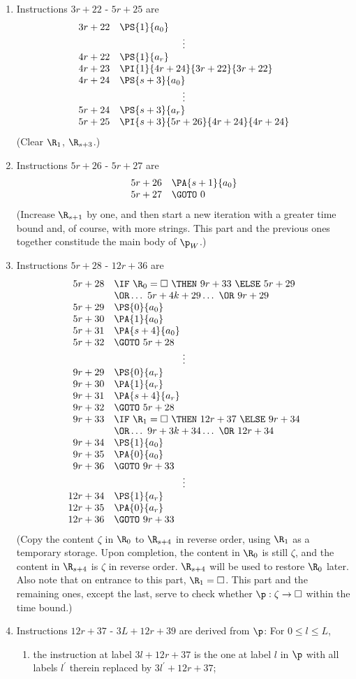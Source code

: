 \begin{enumerate}[1.]
\begin{enumerate}[(1)]
\item Instructions $3r + 22$ - $5r + 25$ are
\[
\begin{array}{rl}
3r + 22 & \PS{1}{a_0} \cr
\multicolumn{2}{c}{\vdots} \cr
4r + 22 & \PS{1}{a_r} \cr
4r + 23 & \PI{1}{4r + 24}{3r + 22}{3r + 22} \cr
4r + 24 & \PS{s + 3}{a_0} \cr
\multicolumn{2}{c}{\vdots} \cr
5r + 24 & \PS{s + 3}{a_r} \cr
5r + 25 & \PI{s + 3}{5r + 26}{4r + 24}{4r + 24}
\end{array}
\]
(Clear $\R_1$, $\R_{s + 3}$.)
\item Instructions $5r + 26$ - $5r + 27$ are
\[
\begin{array}{rl}
5r + 26 & \PA{s + 1}{a_0} \cr
5r + 27 & \GOTO \ 0
\end{array}
\]
(Increase $\R_{s + 1}$ by one, and then start a new iteration with a greater time bound and, of course, with more strings. This part and the previous ones together constitude the main body of $\p_W$.)
\item Instructions $5r + 28$ - $12r + 36$ are
\[
\begin{array}{rl}
5r + 28 & \IF \ \R_0 = \Box \ \THEN \ 9r + 33 \ \ELSE \ 5r + 29 \cr
\       & \OR \ldots \ 5r + 4k + 29 \ldots \ \OR \ 9r + 29 \cr
5r + 29 & \PS{0}{a_0} \cr
5r + 30 & \PA{1}{a_0} \cr
5r + 31 & \PA{s + 4}{a_0} \cr
5r + 32 & \GOTO \ 5r + 28 \cr
\multicolumn{2}{c}{\vdots} \cr
9r + 29 & \PS{0}{a_r} \cr
9r + 30 & \PA{1}{a_r} \cr
9r + 31 & \PA{s + 4}{a_r} \cr
9r + 32 & \GOTO \ 5r + 28 \cr
9r + 33 & \IF \ \R_1 = \Box \ \THEN \ 12r + 37 \ \ELSE \ 9r + 34 \cr
\       & \OR \ldots \ 9r + 3k + 34 \ldots \ \OR \ 12r + 34 \cr
9r + 34 & \PS{1}{a_0} \cr
9r + 35 & \PA{0}{a_0} \cr
9r + 36 & \GOTO \ 9r + 33 \cr
\multicolumn{2}{c}{\vdots} \cr
12r + 34 & \PS{1}{a_r} \cr
12r + 35 & \PA{0}{a_r} \cr
12r + 36 & \GOTO \ 9r + 33
\end{array}
\]
(Copy the content $\zeta$ in $\R_0$ to $\R_{s + 4}$ in reverse order, using $\R_1$ as a temporary storage. Upon completion, the content in $\R_0$ is still $\zeta$, and the content in $\R_{s + 4}$ is $\zeta$ in reverse order. $\R_{s + 4}$ will be used to restore $\R_0$ later. Also note that on entrance to this part, $\R_1 = \Box$. This part and the remaining ones, except the last, serve to check whether $\p : \zeta \to \Box$ within the time bound.)
\item Instructions $12r + 37$ - $3L + 12r + 39$ are derived from $\p$: For $0 \leq l \leq L$,
\begin{enumerate}[1)]
\item the instruction at label $3l + 12r + 37$ is the one at label $l$ in $\p$ with all labels $l^\prime$ therein replaced by $3l^\prime + 12r + 37$;

\end{enumerate}
\end{enumerate}
\end{enumerate}
